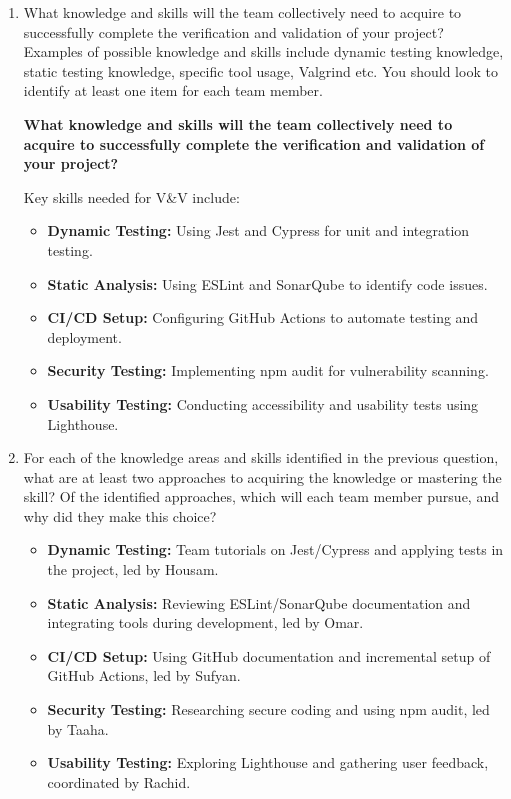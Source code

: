 \documentclass[12pt, titlepage]{article}
\begin{document}
\begin{enumerate}
  \item What knowledge and skills will the team collectively need to acquire to
  successfully complete the verification and validation of your project?
  Examples of possible knowledge and skills include dynamic testing knowledge,
  static testing knowledge, specific tool usage, Valgrind etc.  You should look to
  identify at least one item for each team member. 


    
    \textbf{What knowledge and skills will the team collectively need to acquire to successfully complete the verification and validation of your project?}
    
    Key skills needed for V\&V include:
    
    \begin{itemize}
        \item \textbf{Dynamic Testing:} Using Jest and Cypress for unit and integration testing.
        \item \textbf{Static Analysis:} Using ESLint and SonarQube to identify code issues.
        \item \textbf{CI/CD Setup:} Configuring GitHub Actions to automate testing and deployment.
        \item \textbf{Security Testing:} Implementing npm audit for vulnerability scanning.
        \item \textbf{Usability Testing:} Conducting accessibility and usability tests using Lighthouse.
    \end{itemize}

  \item For each of the knowledge areas and skills identified in the previous
  question, what are at least two approaches to acquiring the knowledge or
  mastering the skill?  Of the identified approaches, which will each team
  member pursue, and why did they make this choice?
  
  \begin{itemize}
    \item \textbf{Dynamic Testing:} Team tutorials on Jest/Cypress and applying tests in the project, led by Housam.
    \item \textbf{Static Analysis:} Reviewing ESLint/SonarQube documentation and integrating tools during development, led by Omar.
    \item \textbf{CI/CD Setup:} Using GitHub documentation and incremental setup of GitHub Actions, led by Sufyan.
    \item \textbf{Security Testing:} Researching secure coding and using npm audit, led by Taaha.
    \item \textbf{Usability Testing:} Exploring Lighthouse and gathering user feedback, coordinated by Rachid.
\end{itemize}

\end{enumerate}
\end{document}
